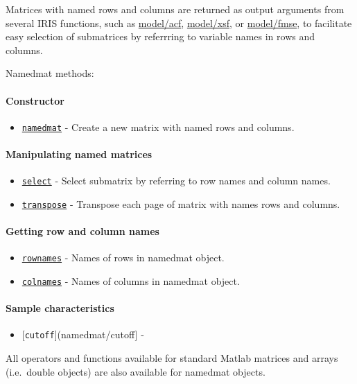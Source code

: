 

	Matrices with named rows and columns are returned as output arguments
from several IRIS functions, such as \url{model/acf}, \url{model/xsf},
or \url{model/fmse}, to facilitate easy selection of submatrices by
referrring to variable names in rows and columns.

Namedmat methods:

\paragraph{Constructor}\label{constructor}

\begin{itemize}
\itemsep1pt\parskip0pt
\item
  \href{namedmat/namedmat}{\texttt{namedmat}} - Create a new matrix with
  named rows and columns.
\end{itemize}

\paragraph{Manipulating named
matrices}\label{manipulating-named-matrices}

\begin{itemize}
\itemsep1pt\parskip0pt
\item
  \href{namedmat/select}{\texttt{select}} - Select submatrix by
  referring to row names and column names.
\item
  \href{namedmat/transpose}{\texttt{transpose}} - Transpose each page of
  matrix with names rows and columns.
\end{itemize}

\paragraph{Getting row and column
names}\label{getting-row-and-column-names}

\begin{itemize}
\itemsep1pt\parskip0pt
\item
  \href{namedmat/rownames}{\texttt{rownames}} - Names of rows in
  namedmat object.
\item
  \href{namedmat/colnames}{\texttt{colnames}} - Names of columns in
  namedmat object.
\end{itemize}

\paragraph{Sample characteristics}\label{sample-characteristics}

\begin{itemize}
\itemsep1pt\parskip0pt
\item
  {[}\texttt{cutoff}{]}(namedmat/cutoff{]} -
\end{itemize}

All operators and functions available for standard Matlab matrices and
arrays (i.e.~double objects) are also available for namedmat objects.



